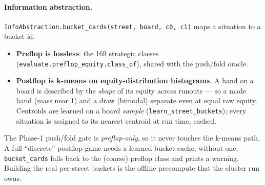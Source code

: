 \documentclass[11pt,a4paper]{article}
\newcommand{\fn}[1]{\texttt{#1}}
\begin{document}
\paragraph{Information abstraction.} \fn{InfoAbstraction.bucket\_cards(street,
board, c0, c1)} maps a situation to a bucket id.

\begin{itemize}[leftmargin=1.4em, itemsep=2pt]
\item \textbf{Preflop is lossless}: the 169 strategic classes
  (\texttt{evaluate.preflop\_equity.class\_of}), shared with the push/fold oracle.
\item \textbf{Postflop is k-means on equity-distribution histograms}. A hand on a
  board is described by the \emph{shape} of its equity across runouts --- so a
  made hand (mass near 1) and a draw (bimodal) separate even at equal raw equity.
  Centroids are learned on a board \emph{sample} (\fn{learn\_street\_buckets});
  every situation is assigned to its nearest centroid at run time, cached.
\end{itemize}

\begin{center}
\end{center}

\begin{trap}
The Phase-1 push/fold gate is \emph{preflop-only}, so it never touches the k-means
path. A full ``discrete'' postflop game needs a learned bucket cache; without one,
\fn{bucket\_cards} falls back to the (coarse) preflop class and prints a warning.
Building the real per-street buckets is the offline precompute that the cluster
run owns.
\end{trap}
\end{document}
